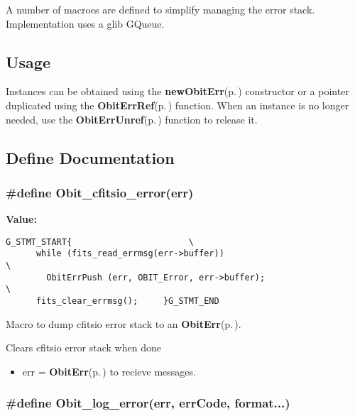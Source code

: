 A number of macroes are defined to simplify managing the error stack. Implementation uses a glib GQueue.\subsection{Usage}\label{ObitErr_8h_ObitErrUsage}
Instances can be obtained using the {\bf new\-Obit\-Err}{\rm (p.\,\pageref{ObitErr_8c_a6})} constructor or a pointer duplicated using the {\bf Obit\-Err\-Ref}{\rm (p.\,\pageref{ObitErr_8c_a7})} function. When an instance is no longer needed, use the {\bf Obit\-Err\-Unref}{\rm (p.\,\pageref{ObitErr_8c_a8})} function to release it.

\subsection{Define Documentation}
\subsubsection{\setlength{\rightskip}{0pt plus 5cm}\#define Obit\_\-cfitsio\_\-error(err)}\label{ObitErr_8h_a7}


{\bf Value:}

\footnotesize\begin{verbatim}G_STMT_START{                       \
      while (fits_read_errmsg(err->buffer))                           \
        ObitErrPush (err, OBIT_Error, err->buffer);                   \
      fits_clear_errmsg();     }G_STMT_END
\end{verbatim}\normalsize 
Macro to dump cfitsio error stack to an {\bf Obit\-Err}{\rm (p.\,\pageref{structObitErr})}. 

Clears cfitsio error stack when done \begin{itemize}
\item err = {\bf Obit\-Err}{\rm (p.\,\pageref{structObitErr})} to recieve messages. \end{itemize}
\subsubsection{\setlength{\rightskip}{0pt plus 5cm}\#define Obit\_\-log\_\-error(err, err\-Code, format...)}\label{ObitErr_8h_a1}


